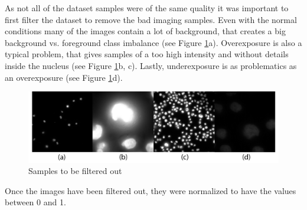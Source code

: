 As not all of the dataset samples were of the same quality it was important to first filter the dataset to remove the bad imaging samples. Even with the normal conditions many of the images contain a lot of background, that creates a big background vs. foreground class imbalance (see Figure \ref{fig:bad-smaples}a). Overexposure is also a typical problem, that gives samples of a too high intensity and without details inside the nucleus (see Figure \ref{fig:bad-smaples}b, c). Lastly, underexposure is as problematics as an overexposure (see Figure \ref{fig:bad-smaples}d).

\begin{figure}[H]
	\begin{center}
		\includegraphics[width=0.6\linewidth]{bilder/nuclei/filter-out.png}
		\caption{Samples to be filtered out}\label{fig:bad-smaples}
	\end{center}
\end{figure}

Once the images have been filtered out, they were normalized to have the values between 0 and 1.